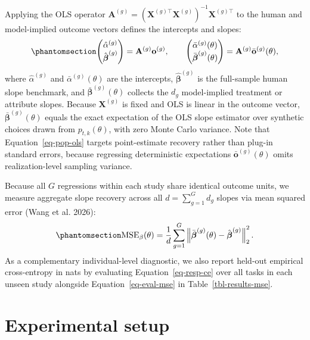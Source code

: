 \documentclass[
  11pt,
  letterpaper,
]{article}
\begin{document}
Applying the OLS operator
\(\mathbf{A}^{(g)} = (\mathbf{X}^{(g)\top}\mathbf{X}^{(g)})^{-1}\mathbf{X}^{(g)\top}\)
to the human and model-implied outcome vectors defines the intercepts
and slopes: \begin{equation}\protect\phantomsection\label{eq-pop-ols}{
\begin{pmatrix}
\hat{\alpha}^{(g)} \\
\hat{\boldsymbol{\beta}}^{(g)}
\end{pmatrix}
= \mathbf{A}^{(g)}\mathbf{o}^{(g)},
\qquad
\begin{pmatrix}
\bar{\alpha}^{(g)}(\theta) \\
\bar{\boldsymbol{\beta}}^{(g)}(\theta)
\end{pmatrix}
= \mathbf{A}^{(g)}\bar{\mathbf{o}}^{(g)}(\theta),
}\end{equation} where \(\hat{\alpha}^{(g)}\) and
\(\bar{\alpha}^{(g)}(\theta)\) are the intercepts,
\(\hat{\boldsymbol{\beta}}^{(g)}\) is the full-sample human slope
benchmark, and \(\bar{\boldsymbol{\beta}}^{(g)}(\theta)\) collects the
\(d_g\) model-implied treatment or attribute slopes. Because
\(\mathbf{X}^{(g)}\) is fixed and OLS is linear in the outcome vector,
\(\bar{\boldsymbol{\beta}}^{(g)}(\theta)\) equals the exact expectation
of the OLS slope estimator over synthetic choices drawn from
\(p_{t,k}(\theta)\), with zero Monte Carlo variance. Note that
Equation~\ref{eq-pop-ols} targets point-estimate recovery rather than
plug-in standard errors, because regressing deterministic expectations
\(\bar{\mathbf{o}}^{(g)}(\theta)\) omits realization-level sampling
variance.

Because all \(G\) regressions within each study share identical outcome
units, we measure aggregate slope recovery across all
\(d = \sum_{g=1}^G d_g\) slopes via mean squared error (Wang et al.
2026): \begin{equation}\protect\phantomsection\label{eq-eval-mse}{
\mathrm{MSE}_{\beta}(\theta) = \frac{1}{d} \sum_{g=1}^G \left\lVert \bar{\boldsymbol{\beta}}^{(g)}(\theta) - \hat{\boldsymbol{\beta}}^{(g)} \right\rVert_2^2.
}\end{equation} As a complementary individual-level diagnostic, we also
report held-out empirical cross-entropy in nats by evaluating
Equation~\ref{eq-resp-ce} over all tasks in each unseen study alongside
Equation~\ref{eq-eval-mse} in Table~\ref{tbl-results-mse}.

\section{Experimental setup}\label{sec-setup}
\end{document}
